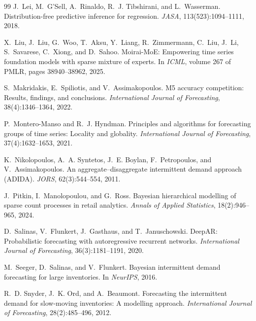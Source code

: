 \documentclass[twoside]{article}
\theoremstyle{definition}
\begin{document}
\begin{thebibliography}{99}
J.~Lei, M.~G'Sell, A.~Rinaldo, R.~J. Tibshirani, and L.~Wasserman.
\newblock Distribution-free predictive inference for regression.
\newblock \emph{JASA}, 113(523):1094--1111, 2018.

X.~Liu, J.~Liu, G.~Woo, T.~Aksu, Y.~Liang, R.~Zimmermann, C.~Liu,
  J.~Li, S.~Savarese, C.~Xiong, and D.~Sahoo.
\newblock Moirai-MoE: Empowering time series foundation models with sparse
  mixture of experts.
\newblock In \emph{ICML}, volume 267 of PMLR, pages 38940--38962, 2025.

S.~Makridakis, E.~Spiliotis, and V.~Assimakopoulos.
\newblock M5 accuracy competition: Results, findings, and conclusions.
\newblock \emph{International Journal of Forecasting}, 38(4):1346--1364, 2022.

P.~Montero-Manso and R.~J. Hyndman.
\newblock Principles and algorithms for forecasting groups of time
  series: Locality and globality.
\newblock \emph{International Journal of Forecasting}, 37(4):1632--1653,
  2021.

K.~Nikolopoulos, A.~A. Syntetos, J.~E. Boylan, F.~Petropoulos, and
  V.~Assimakopoulos.
\newblock An aggregate--disaggregate intermittent demand approach (ADIDA).
\newblock \emph{JORS}, 62(3):544--554, 2011.

J.~Pitkin, I.~Manolopoulou, and G.~Ross.
\newblock Bayesian hierarchical modelling of sparse count processes in
  retail analytics.
\newblock \emph{Annals of Applied Statistics}, 18(2):946--965, 2024.

D.~Salinas, V.~Flunkert, J.~Gasthaus, and T.~Januschowski.
\newblock DeepAR: Probabilistic forecasting with autoregressive recurrent
  networks.
\newblock \emph{International Journal of Forecasting}, 36(3):1181--1191, 2020.

M.~Seeger, D.~Salinas, and V.~Flunkert.
\newblock Bayesian intermittent demand forecasting for large inventories.
\newblock In \emph{NeurIPS}, 2016.

R.~D. Snyder, J.~K. Ord, and A.~Beaumont.
\newblock Forecasting the intermittent demand for slow-moving
  inventories: A modelling approach.
\newblock \emph{International Journal of Forecasting}, 28(2):485--496,
  2012.


\end{thebibliography}
\end{document}
